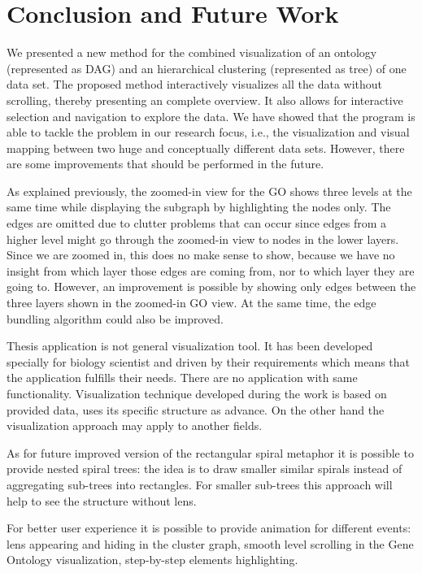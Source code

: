 \section{Conclusion and Future Work}
\label{sec:conclusion}

We presented a new method for the combined visualization of an ontology (represented as DAG) and an hierarchical clustering (represented as tree) of one data set. The proposed method interactively visualizes all the data without scrolling, thereby presenting an complete overview. It also allows for interactive selection and navigation to explore the data. We have showed that the program is able to tackle the problem in our research focus, i.e., the visualization and visual mapping between two huge and conceptually different data sets. However, there are some improvements that should be performed in the future.

As explained previously, the zoomed-in view for the GO shows three levels at the same time while displaying the subgraph by highlighting the nodes only. The edges are omitted due to clutter problems that can occur since edges from a higher level might go through the zoomed-in view to nodes in the lower layers. Since we are zoomed in, this does no make sense to show, because we have no insight from which layer those edges are coming from, nor to which layer they are going to. However, an improvement is possible by showing only edges between the three layers shown in the zoomed-in GO view. At the same time, the edge bundling algorithm could also be improved.

Thesis application is not general visualization tool. It has been developed specially for biology scientist and driven by their requirements which means that the application fulfills their needs. There are no application with same functionality. Visualization technique developed during the work is based on provided data, uses its specific structure as advance. On the other hand the visualization approach may apply to another fields.

As for future improved version of the rectangular spiral metaphor it is possible to provide nested spiral trees: the idea is to draw smaller similar spirals instead of aggregating sub-trees into rectangles. For smaller sub-trees this approach will help to see the structure without lens.

For better user experience it is possible to provide animation for different events: lens appearing and hiding in the cluster graph, smooth level scrolling in the Gene Ontology visualization, step-by-step elements highlighting.